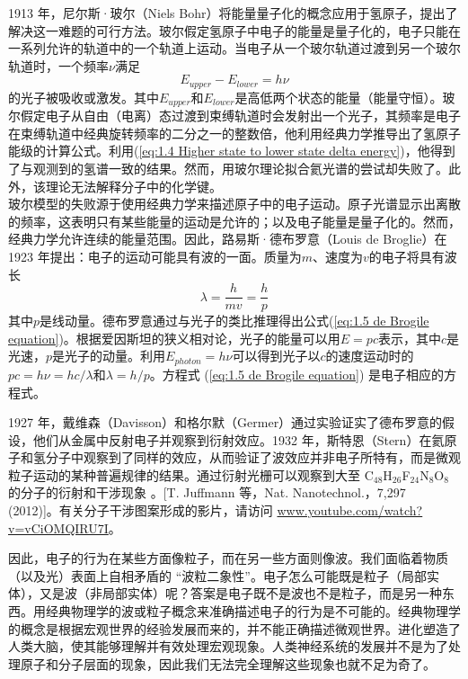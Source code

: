 	1913 年，尼尔斯·玻尔（Niels Bohr）将能量量子化的概念应用于氢原子，提出了解决这一难题的可行方法。玻尔假定氢原子中电子的能量是量子化的，电子只能在一系列允许的轨道中的一个轨道上运动。当电子从一个玻尔轨道过渡到另一个玻尔轨道时，一个频率$\nu$满足
	\begin{equation}
		\boxed{E_{upper}-E_{lower}=h\nu}
		\label{eq:1.4 Higher state to lower state delta energy}
	\end{equation}
	的光子被吸收或激发。其中$E_{upper}$和$E_{lower}$是高低两个状态的能量（能量守恒）。玻尔假定电子从自由（电离）态过渡到束缚轨道时会发射出一个光子，其频率是电子在束缚轨道中经典旋转频率的二分之一的整数倍，他利用经典力学推导出了氢原子能级的计算公式。利用(\ref{eq:1.4 Higher state to lower state delta energy})，他得到了与观测到的氢谱一致的结果。然而，用玻尔理论拟合氦光谱的尝试却失败了。此外，该理论无法解释分子中的化学键。\\
	\indent 玻尔模型的失败源于使用经典力学来描述原子中的电子运动。原子光谱显示出离散的频率，这表明只有某些能量的运动是允许的；以及电子能量是量子化的。然而，经典力学允许连续的能量范围。因此，路易斯·德布罗意（Louis de Broglie）在 1923 年提出：电子的运动可能具有波的一面。质量为$m$、速度为$v$的电子将具有波长
	\begin{equation}
		\lambda=\frac{h}{mv}=\frac{h}{p}
		\label{eq:1.5 de Brogile equation}
	\end{equation}
	其中$p$是线动量。德布罗意通过与光子的类比推理得出公式(\ref{eq:1.5 de Brogile equation})。根据爱因斯坦的狭义相对论，光子的能量可以用$E=pc$表示，其中$c$是光速，$p$是光子的动量。利用$E_{photon}=h\nu$可以得到光子以$c$的速度运动时的$pc=h\nu =hc/\lambda$和$\lambda = h/p$。方程式 (\ref{eq:1.5 de Brogile equation}) 是电子相应的方程式。

	1927 年，戴维森（Davisson）和格尔默（Germer）通过实验证实了德布罗意的假设，他们从金属中反射电子并观察到衍射效应。1932 年，斯特恩（Stern）在氦原子和氢分子中观察到了同样的效应，从而验证了波效应并非电子所特有，而是微观粒子运动的某种普遍规律的结果。通过衍射光栅可以观察到大至 C$_{48}$H$_{26}$F$_{24}$N$_8$O$_8$的分子的衍射和干涉现象	。[T. Juffmann 等，Nat. Nanotechnol.，7,297 (2012)]。有关分子干涉图案形成的影片，请访问 \url{www.youtube.com/watch?v=vCiOMQIRU7I}。

	因此，电子的行为在某些方面像粒子，而在另一些方面则像波。我们面临着物质（以及光）表面上自相矛盾的 “波粒二象性”。电子怎么可能既是粒子（局部实体），又是波（非局部实体）呢？答案是电子既不是波也不是粒子，而是另一种东西。用经典物理学的波或粒子概念来准确描述电子的行为是不可能的。经典物理学的概念是根据宏观世界的经验发展而来的，并不能正确描述微观世界。进化塑造了人类大脑，使其能够理解并有效处理宏观现象。人类神经系统的发展并不是为了处理原子和分子层面的现象，因此我们无法完全理解这些现象也就不足为奇了。

